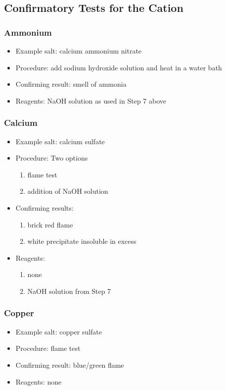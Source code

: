 \subsection{Confirmatory Tests for the Cation}

\subsubsection{Ammonium}
\begin{itemize}
\item{Example salt: calcium ammonium nitrate}
\item{Procedure: add sodium hydroxide solution and heat in a water bath}
\item{Confirming result: smell of ammonia} 
\item{Reagents: NaOH solution as used in Step 7 above}
\end{itemize}

\subsubsection{Calcium}
\begin{itemize}
\item{Example salt: calcium sulfate}

\item{Procedure: Two options
\begin{enumerate}
\item{flame test}
\item{addition of NaOH solution}
\end{enumerate}
} %

\item{Confirming results:
\begin{enumerate}
\item{brick red flame}
\item{white precipitate insoluble in excess}
\end{enumerate}
} %

\item{Reagents:
\begin{enumerate}
\item{none}
\item{NaOH solution from Step 7}
\end{enumerate}
} %

\end{itemize} %

\subsubsection{Copper}
\begin{itemize}
\item{Example salt: copper sulfate}
\item{Procedure: flame test}
\item{Confirming result: blue/green flame}
\item{Reagents: none}
\end{itemize}

